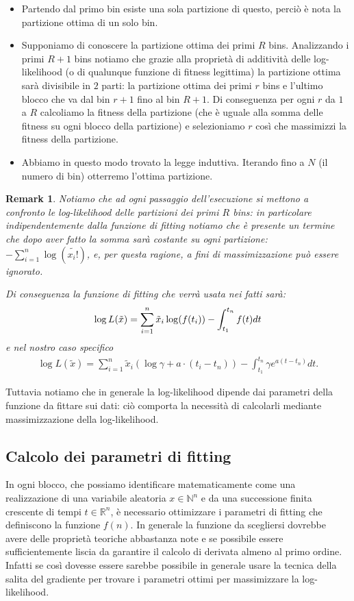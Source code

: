 \documentclass[10pt,a4paper]{report}
\newtheorem{remark}{Remark}
\begin{document}
\begin{itemize}
\item Partendo dal primo bin esiste una sola partizione di questo, perciò è nota la partizione ottima di un solo bin.
\item Supponiamo di conoscere la partizione ottima dei primi $R$ bins. Analizzando i primi $R+1$ bins notiamo che grazie alla proprietà di additività delle log-likelihood (o di qualunque funzione di fitness legittima) la partizione ottima sarà divisibile in $2$ parti: la partizione ottima dei primi $r$ bins e l'ultimo blocco che va dal bin $r+1$ fino al bin $R+1$. Di conseguenza per ogni $r$ da $1$ a $R$ calcoliamo la fitness della partizione (che è uguale alla somma delle fitness su ogni blocco della partizione) e selezioniamo $r$ così che massimizzi la fitness della partizione.
\item Abbiamo in questo modo trovato la legge induttiva. Iterando fino a $N$ (il numero di bin) otterremo l'ottima partizione.
\end{itemize}
\begin{remark}
Notiamo che ad ogni passaggio dell'esecuzione si mettono a confronto le log-likelihood delle partizioni dei primi $R$ bins: in particolare indipendentemente dalla funzione di fitting notiamo che è presente un termine che dopo aver fatto la somma sarà costante su ogni partizione: $-\sum_{i=1}^n \log(\tilde{x_i!})$, e, per questa ragione, a fini di massimizzazione può essere ignorato.

Di conseguenza la funzione di fitting che verrà usata nei fatti sarà:
\begin{equation}\label{Cash}
\log L(\tilde{x}) = \sum_{i=1}^n\tilde{x}_i\log(f(t_i)) -\int_{t_1}^{t_n}f(t) dt \\
\end{equation}
e nel nostro caso specifico
\begin{gather}
\log L(\tilde{x}) = \sum_{i=1}^n\tilde{x}_i(\log\gamma + a\cdot(t_i-t_n)) -\int_{t_1}^{t_n}\gamma e^{a(t-t_n)} dt.\label{fitness_exp}
\end{gather}
\end{remark}
Tuttavia notiamo che in generale la log-likelihood dipende dai parametri della funzione da fittare sui dati: ciò comporta la necessità di calcolarli mediante massimizzazione della log-likelihood.
\subsection{Calcolo dei parametri di fitting}
In ogni blocco, che possiamo identificare matematicamente come una realizzazione di una variabile aleatoria $x\in\mathbb{N}^n$ e da una successione finita crescente di tempi $t\in\mathbb{R}^n$, è necessario ottimizzare i parametri di fitting che definiscono la funzione $f(n)$. In generale la funzione da scegliersi dovrebbe avere delle proprietà teoriche abbastanza note e se possibile essere sufficientemente liscia da garantire il calcolo di derivata almeno al primo ordine. Infatti se così dovesse essere sarebbe possibile in generale usare la tecnica della salita del gradiente per trovare i parametri ottimi per massimizzare la log-likelihood.
\end{document}
